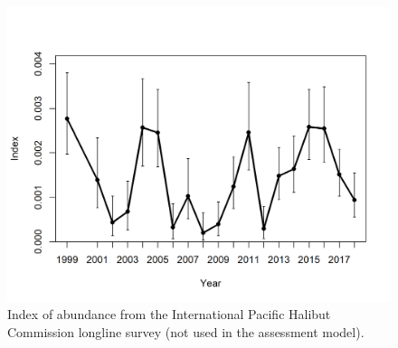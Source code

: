 \documentclass[12pt,]{article}
\begin{document}
\begin{figure}
\centering
\includegraphics{Figures/IPHC index for Big Skate.png}
\caption{Index of abundance from the International Pacific Halibut
Commission longline survey (not used in the assessment
model).\label{fig:IPHC_index}}
\end{figure}
\end{document}
